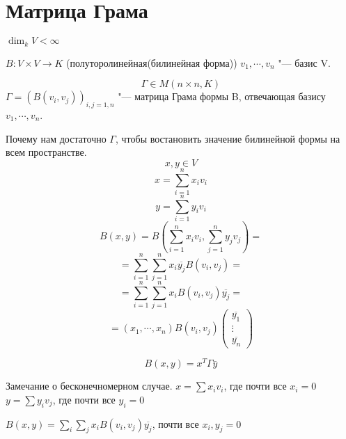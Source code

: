 ﻿\section{Матрица Грама}
\begin{Def}
$\dim_k V < \infty$

$B \colon V \times V \to K$ (полуторолинейная(билинейная форма))
$v_1, \cdots, v_n$ "--- базис V.

$$\Gamma \in M(n \times n,  K)$$
$\Gamma = (B(v_i, v_j))_{i,j = 1,n}$ "--- матрица Грама формы B, отвечающая базису $v_1, \cdots, v_n$.
\end{Def}


Почему нам достаточно $\Gamma$, чтобы востановить значение билинейной формы на всем пространстве.
$$x, y \in V$$
$$x = \sum_{i = 1}^{n}x_i v_i$$
$$y = \sum_{i = 1}^{n}y_i v_i$$
$$B(x, y) = B(\sum_{i = 1}^{n}x_iv_i, \sum_{j = 1}^{n} y_{j}v_j) = $$
$$= \sum_{i = 1}^{n}\sum_{j = 1}^{n}x_i \overline{y_j} B(v_i, v_j) = $$
$$= \sum_{i = 1}^{n}\sum_{j = 1}^{n}x_i B(v_i, v_j)\overline{y_j} = $$
$$= (x_1, \cdots, x_n) B(v_i, v_j) \begin{pmatrix}\overline{y_1}\\ \vdots \\ \overline{y_n} \end{pmatrix} $$

$$B(x, y) = x^{T}\Gamma\bar y$$

\begin{Rem}
Замечание о бесконечномерном случае.
$x = \sum x_i v_i$, где почти все $x_i = 0$
$y = \sum y_i v_j$, где почти все $y_i = 0$ 

$B(x, y) = \sum_i \sum_j x_i B(v_i, v_j) \overline{y_j}$, почти все $x_i, y_j = 0$
\end{Rem}

